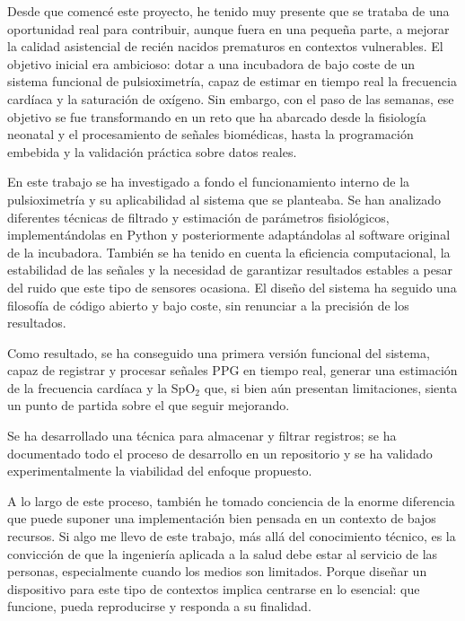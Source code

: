 
Desde que comencé este proyecto, he tenido muy presente que se trataba de una oportunidad real para contribuir, aunque fuera en una pequeña parte, a mejorar la calidad asistencial de recién nacidos prematuros en contextos vulnerables. El objetivo inicial era ambicioso: dotar a una incubadora de bajo coste de un sistema funcional de pulsioximetría, capaz de estimar en tiempo real la frecuencia cardíaca y la saturación de oxígeno. Sin embargo, con el paso de las semanas, ese objetivo se fue transformando en un reto que ha abarcado desde la fisiología neonatal y el procesamiento de señales biomédicas, hasta la programación embebida y la validación práctica sobre datos reales.

En este trabajo se ha investigado a fondo el funcionamiento interno de la pulsioximetría y su aplicabilidad al sistema que se planteaba. Se han analizado diferentes técnicas de filtrado y estimación de parámetros fisiológicos, implementándolas en Python y posteriormente adaptándolas al software original de la incubadora. También se ha tenido en cuenta la eficiencia computacional, la estabilidad de las señales y la necesidad de garantizar resultados estables a pesar del ruido que este tipo de sensores ocasiona. El diseño del sistema ha seguido una filosofía de código abierto y bajo coste, sin renunciar a la precisión de los resultados.

Como resultado, se ha conseguido una primera versión funcional del sistema, capaz de registrar y procesar señales PPG en tiempo real, generar una estimación de la frecuencia cardíaca y la SpO$_2$ que, si bien aún presentan limitaciones, sienta un punto de partida sobre el que seguir mejorando. 

Se ha desarrollado una técnica para almacenar y filtrar registros; se ha documentado todo el proceso de desarrollo en un repositorio y se ha validado experimentalmente la viabilidad del enfoque propuesto.

A lo largo de este proceso, también he tomado conciencia de la enorme diferencia que puede suponer una implementación bien pensada en un contexto de bajos recursos. Si algo me llevo de este trabajo, más allá del conocimiento técnico, es la convicción de que la ingeniería aplicada a la salud debe estar al servicio de las personas, especialmente cuando los medios son limitados. Porque diseñar un dispositivo para este tipo de contextos implica centrarse en lo esencial: que funcione, pueda reproducirse y responda a su finalidad.

